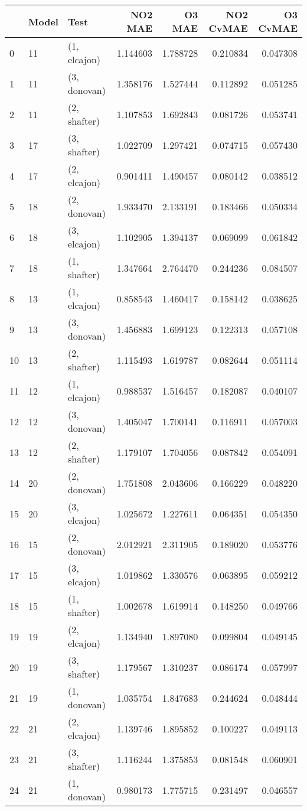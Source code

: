 \begin{tabular}{lllrrrr}
\toprule
{} & Model &          Test &   NO2 MAE &    O3 MAE &  NO2 CvMAE &  O3 CvMAE \\
\midrule
0  &    11 &  (1, elcajon) &  1.144603 &  1.788728 &   0.210834 &  0.047308 \\
1  &    11 &  (3, donovan) &  1.358176 &  1.527444 &   0.112892 &  0.051285 \\
2  &    11 &  (2, shafter) &  1.107853 &  1.692843 &   0.081726 &  0.053741 \\
3  &    17 &  (3, shafter) &  1.022709 &  1.297421 &   0.074715 &  0.057430 \\
4  &    17 &  (2, elcajon) &  0.901411 &  1.490457 &   0.080142 &  0.038512 \\
5  &    18 &  (2, donovan) &  1.933470 &  2.133191 &   0.183466 &  0.050334 \\
6  &    18 &  (3, elcajon) &  1.102905 &  1.394137 &   0.069099 &  0.061842 \\
7  &    18 &  (1, shafter) &  1.347664 &  2.764470 &   0.244236 &  0.084507 \\
8  &    13 &  (1, elcajon) &  0.858543 &  1.460417 &   0.158142 &  0.038625 \\
9  &    13 &  (3, donovan) &  1.456883 &  1.699123 &   0.122313 &  0.057108 \\
10 &    13 &  (2, shafter) &  1.115493 &  1.619787 &   0.082644 &  0.051114 \\
11 &    12 &  (1, elcajon) &  0.988537 &  1.516457 &   0.182087 &  0.040107 \\
12 &    12 &  (3, donovan) &  1.405047 &  1.700141 &   0.116911 &  0.057003 \\
13 &    12 &  (2, shafter) &  1.179107 &  1.704056 &   0.087842 &  0.054091 \\
14 &    20 &  (2, donovan) &  1.751808 &  2.043606 &   0.166229 &  0.048220 \\
15 &    20 &  (3, elcajon) &  1.025672 &  1.227611 &   0.064351 &  0.054350 \\
16 &    15 &  (2, donovan) &  2.012921 &  2.311905 &   0.189020 &  0.053776 \\
17 &    15 &  (3, elcajon) &  1.019862 &  1.330576 &   0.063895 &  0.059212 \\
18 &    15 &  (1, shafter) &  1.002678 &  1.619914 &   0.148250 &  0.049766 \\
19 &    19 &  (2, elcajon) &  1.134940 &  1.897080 &   0.099804 &  0.049145 \\
20 &    19 &  (3, shafter) &  1.179567 &  1.310237 &   0.086174 &  0.057997 \\
21 &    19 &  (1, donovan) &  1.035754 &  1.847683 &   0.244624 &  0.048444 \\
22 &    21 &  (2, elcajon) &  1.139746 &  1.895852 &   0.100227 &  0.049113 \\
23 &    21 &  (3, shafter) &  1.116244 &  1.375853 &   0.081548 &  0.060901 \\
24 &    21 &  (1, donovan) &  0.980173 &  1.775715 &   0.231497 &  0.046557 \\
\bottomrule
\end{tabular}
